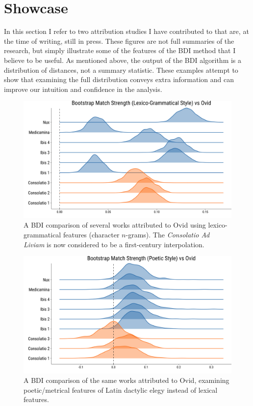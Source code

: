 \documentclass[
    hf
]{ceurart}
\begin{document}
\section{Showcase}\label{sec:showcase}

In this section I refer to two attribution studies I have contributed to that
are, at the time of writing, still in press. These figures are not full
summaries of the research, but simply illustrate some of the features of the BDI
method that I believe to be useful. As mentioned above, the output of the BDI
algorithm is a distribution of distances, not a summary statistic. These
examples attempt to show that examining the full distribution conveys extra
information and can improve our intuition and confidence in the analysis.

\begin{figure}
    \includegraphics[width=\linewidth]{figures/bootstrap_lexical_paper.png}
    \caption{A BDI comparison of several works attributed to Ovid using
        lexico-grammatical features (character $n$-grams). The \emph{Consolatio Ad
            Liviam} is now considered to be a first-century interpolation.}
    \label{fig:nux_lex}
\end{figure}

\begin{figure}
    \includegraphics[width=\linewidth]{figures/bootstrap_poetics_paper.png}
    \caption{A BDI comparison of the same works attributed to Ovid, examining
        poetic/metrical features of Latin dactylic elegy instead of lexical
        features.}
    \label{fig:nux_poet}
\end{figure}
\end{document}
